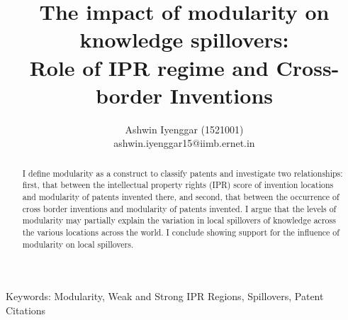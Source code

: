 \documentclass[12pt]{article}
\begin{document}
\title{\LARGE The impact of modularity on knowledge spillovers:\\ \Large Role of IPR regime and Cross-border Inventions}
\author{Ashwin Iyenggar  (1521001) \\ ashwin.iyenggar15@iimb.ernet.in} 
\large

\maketitle
\thispagestyle{empty}

\begin{abstract}
\large \noindent I define modularity as a construct to classify patents and investigate two relationships: first, that between the intellectual property rights (IPR) score of invention locations and modularity of patents invented there, and second, that between the occurrence of cross border inventions and modularity of patents invented. I argue that the levels of modularity may partially explain the variation in local spillovers of knowledge across the various locations across the world. I conclude showing support for the influence of modularity on local spillovers.
\end{abstract}
{Keywords:} Modularity, Weak and Strong IPR Regions, Spillovers, Patent Citations
\doublespacing
\end{document}
